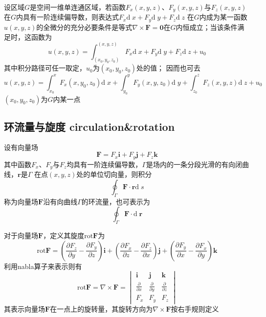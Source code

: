 \documentclass[UTF8]{ctexart}
\newcommand{\cross}{\times}
\newcommand{\dif}[1]{{\mathrm{d}\;\!#1}}
\newcommand{\ve}[1]{{\bm{#1}}}
\newcommand{\emplin}{\vspace{1em}}
\begin{document}
\emplin

设区域$G$是空间一维单连通区域，若函数$F_x(x,y,z)$、$F_y(x,y,z)$与$F_z(x,y,z)$在$G$内具有一阶连续偏导数，则表达式$F_x\dif{x}+F_y\dif{y}+F_z\dif{z}$
在$G$内成为某一函数$u(x,y,z)$的全微分的充分必要条件是等式$\nabla\cross\ve{F}=\ve{0}$在$G$内恒成立；当该条件满足时，这函数为
\[ u(x,y,z)=\int_{(x_0,y_0,z_0)}^{(x,y,z)} F_x\dif{x}+F_y\dif{y}+F_z\dif{z}+u_0 \]
其中积分路径可任一取定，$u_0$为$(x_0,y_0,z_0)$处的值；
因而也可去
\[u(x,y,z)=\int_{x_0}^x F_x(x,y_0,z_0)\dif{x}+ \int_{y_0}^yF_y(x,y,z_0)\dif{y}+ \int_{z_0}^zF_z(x,y,z)\dif{z}+u_0\]
$(x_0,y_0,z_0)$为$G$内某一点

\subsection*{环流量与旋度 circulation\&rotation}
设有向量场
\[\ve{F}=F_x\ve{i}+F_y\ve{j}+F_z\ve{k}\]
其中函数$F_x$、$F_y$与$F_z$均具有一阶连续偏导数，$\Gamma$是场内的一条分段光滑的有向闭曲线，$\ve{r}$是$\Gamma$
在点$(x,y,z)$处的单位切向量，则积分
\[\oint_\Gamma\ve{F}\cdot\ve{r}\dif{s}\]
称为向量场$\ve{F}$沿有向曲线$\Gamma$的环流量，也可表示为
\[ \oint_\Gamma\ve{F}\cdot\dif{\ve{r}} \]

\emplin

对于向量场$\ve{F}$，定义其旋度$\text{rot}\ve{F}$为
\[\text{rot}\ve{F}=
\left( \frac{\partial F_z}{\partial y} - \frac{\partial F_y}{\partial z} \right)\ve{i}+
\left( \frac{\partial F_x}{\partial z} - \frac{\partial F_z}{\partial x} \right)\ve{j}+
\left( \frac{\partial F_y}{\partial x} - \frac{\partial F_x}{\partial y} \right)\ve{k}
\]
利用nabla算子来表示则有
\[\text{rot}\ve{F}=
\nabla\cross\ve{F}=
\begin{vmatrix}
\ve{i}&\ve{j}&\ve{k}\\
\frac{\partial}{\partial x}&\frac{\partial}{\partial y}&\frac{\partial}{\partial z}\\
F_x&F_y&F_z
\end{vmatrix}
\]
其表示向量场$\ve{F}$在一点上的旋转量，其旋转方向为$\nabla\cross\ve{F}$按右手规则定义
\end{document}
